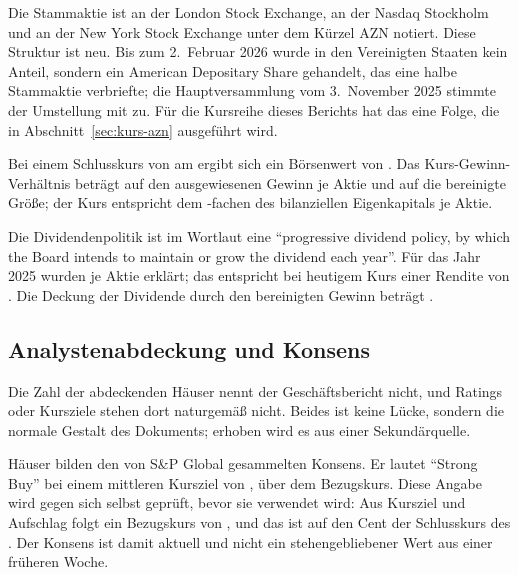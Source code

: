 Die Stammaktie ist an der London Stock Exchange, an der Nasdaq Stockholm und
an der New York Stock Exchange unter dem K\"urzel AZN notiert.
Diese Struktur ist neu. Bis zum 2.~Februar 2026 wurde in den Vereinigten
Staaten kein Anteil, sondern ein American Depositary Share gehandelt, das eine
halbe Stammaktie verbriefte; die Hauptversammlung vom 3.~November 2025 stimmte
der Umstellung mit \Pct{\AznZustimmungNotierung} zu.
F\"ur die Kursreihe dieses Berichts hat das eine Folge, die in
Abschnitt~\ref{sec:kurs-azn} ausgef\"uhrt wird.

Bei einem Schlusskurs von \USDje{\AznKurs} am \Datum{\AznKursTag} ergibt sich ein
B\"orsenwert von \MrdUSD{\AznMarktwertMrd}. Das Kurs-Gewinn-Verh\"altnis
betr\"agt \Faktor{\AznKursGewinn} auf den ausgewiesenen Gewinn je Aktie und
\Faktor{\AznKursGewinnCore} auf die bereinigte Gr\"o{\ss}e; der Kurs entspricht
dem \Faktor{\AznKursBuchwert}-fachen des bilanziellen Eigenkapitals je Aktie.

Die Dividendenpolitik ist im Wortlaut eine \enquote{progressive dividend
policy, by which the Board intends to maintain or grow the dividend each
year}.
F\"ur das Jahr 2025 wurden \USDje{\AznDividendeJeAktie} je Aktie erkl\"art;
das entspricht bei heutigem Kurs einer Rendite von
\Pct{\AznDividendenrendite}.
Die Deckung der Dividende durch den bereinigten Gewinn betr\"agt
\Faktor{\AznDividendeDeckungCore}.

\subsection{Analystenabdeckung und Konsens}

Die Zahl der abdeckenden H\"auser nennt der Gesch\"aftsbericht nicht, und
Ratings oder Kursziele stehen dort naturgem\"a{\ss} nicht. Beides ist keine
L\"ucke, sondern die normale Gestalt des Dokuments; erhoben wird es aus einer
Sekund\"arquelle.

\Stueck{\AznKonsensHaeuser} H\"auser bilden den von S\&P Global gesammelten
Konsens. Er lautet \enquote{Strong Buy} bei einem mittleren Kursziel von
\USDje{\AznKonsensZiel}, \Pct{\AznKonsensAufschlag} \"uber dem
Bezugskurs.
Diese Angabe wird gegen sich selbst gepr\"uft, bevor sie verwendet wird: Aus
Kursziel und Aufschlag folgt ein Bezugskurs von \USDje{\AznKonsensBezug}, und
das ist auf den Cent der Schlusskurs des \Datum{\AznKursTag}. Der Konsens ist damit
aktuell und nicht ein stehengebliebener Wert aus einer fr\"uheren Woche.

